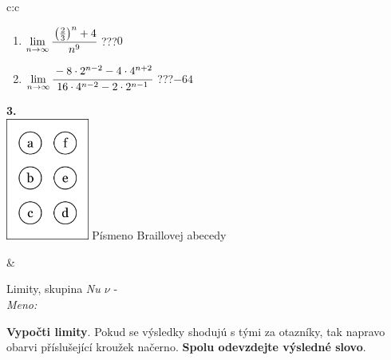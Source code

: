 \documentclass[10pt]{report}
\begin{document}
\begin{tabular}{c:c}
\begin{minipage}[c][104.5mm][t]{0.5\linewidth}
\begin{center}
\begin{minipage}{0.79\linewidth}
\begin{center}
\begin{varwidth}{\linewidth}
\begin{enumerate}
\item $\lim\limits_{n\to\infty}\cfrac{\left(\frac{2}{3}\right)^n +4}{n^{9}}$\quad \dotfill\; ???\;\dotfill \quad $0$
\item $\lim\limits_{n\to\infty}\cfrac{-8\cdot 2^{n-2}-4\cdot 4^{n+2}}{16\cdot 4^{n-2}-2\cdot 2^{n-1}}$\quad \dotfill\; ???\;\dotfill \quad $-64$
\end{enumerate}
\end{varwidth}
\end{center}
\end{minipage}
\begin{minipage}{0.20\linewidth}
\begin{center}
{\Huge\bfseries 3.} \\[2mm]
\includegraphics[height=40mm]{../images/braille.png}
{\small Písmeno Braillovej abecedy}
\end{center}
\end{minipage}
\end{center}
\end{minipage}
&
\begin{minipage}[c][104.5mm][t]{0.5\linewidth}
\begin{center}
\vspace{7mm}
{\huge Limity, skupina \textit{Nu $\nu$} -}\\[5mm]
\textit{Meno:}\phantom{xxxxxxxxxxxxxxxxxxxxxxxxxxxxxxxxxxxxxxxxxxxxxxxxxxxxxxxxxxxxxxxxx}\\[5mm]
\begin{minipage}{0.95\linewidth}
\begin{center}
\textbf{Vypočti limity}. Pokud se výsledky shodujú s tými za otazníky, tak napravo\\obarvi příslušející kroužek načerno. \textbf{Spolu odevzdejte výsledné slovo}.
\end{center}
\end{minipage}
\\[1mm]
\begin{minipage}{0.79\linewidth}
\begin{center}
\begin{varwidth}{\linewidth}

\end{varwidth}
\end{center}
\end{minipage}
\end{center}
\end{minipage}
\end{tabular}
\end{document}
